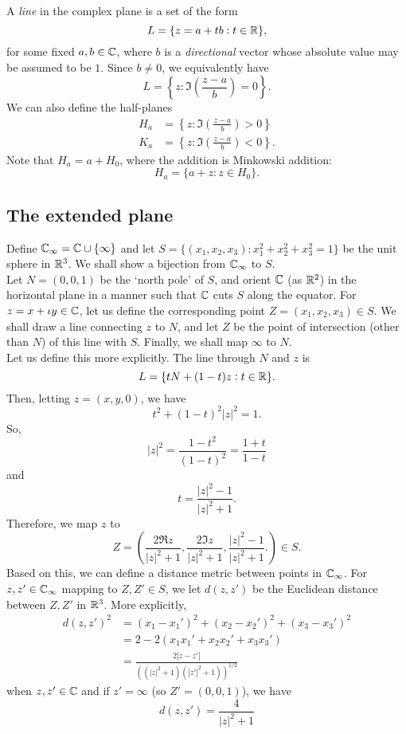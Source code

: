 	A \emph{line} in the complex plane is a set of the form
	\[ L = \{ z = a+tb : t \in \mathbb{R} \}, \]
	for some fixed $a,b\in\mathbb{C}$, where $b$ is a \emph{directional} vector whose absolute value may be assumed to be $1$. Since $b \ne 0$, we equivalently have
	\[ L = \left\{ z : \Im\left( \frac{z-a}{b} \right) = 0 \right\}. \]
	We can also define the half-planes
	\begin{align*}
		H_a &= \left\{ z : \Im\left( \frac{z-a}{b} \right) > 0 \right\} \\
		K_a &= \left\{ z : \Im\left( \frac{z-a}{b} \right) < 0 \right\}.
	\end{align*}
	Note that $H_a = a + H_0$, where the addition is Minkowski addition:
	\[ H_a = \{ a + z : z \in H_0 \}. \]

\subsection{The extended plane}
	
	Define $\mathbb{C}_\infty = \mathbb{C} \cup \{\infty\}$ and let $S = \{(x_1,x_2,x_3) : x_1^2 + x_2^2 + x_3^2 = 1\}$ be the unit sphere in $\mathbb{R}^3$. We shall show a bijection from $\mathbb{C}_\infty$ to $S$.\\
	Let $N = (0,0,1)$ be the `north pole' of $S$, and orient $\mathbb{C}$ (as $\mathbb{R}^2$) in the horizontal plane in a manner such that $\mathbb{C}$ cuts $S$ along the equator. For $z = x + \iota y \in \mathbb{C}$, let us define the corresponding point $Z = (x_1,x_2,x_3) \in S$. We shall draw a line connecting $z$ to $N$, and let $Z$ be the point of intersection (other than $N$) of this line with $S$. Finally, we shall map $\infty$ to $N$.\\
	Let us define this more explicitly. The line through $N$ and $z$ is
	\[ L = \{ tN + (1-t)z : t \in \mathbb{R} \}. \]
	Then, letting $z = (x,y,0)$, we have
	\[ t^2 + (1-t)^2 |z|^2 = 1. \]
	So,
	\[ |z|^2 = \frac{1-t^2}{(1-t)^2} = \frac{1+t}{1-t} \]
	and
	\[ t = \frac{|z|^2-1}{|z|^2+1}. \]
	Therefore, we map $z$ to
	\[ Z = \left( \frac{2 \Re z}{|z|^2+1} , \frac{2 \Im z}{|z|^2+1} , \frac{|z|^2-1}{|z|^2+1}. \right) \in S. \]
	Based on this, we can define a distance metric between points in $\mathbb{C}_\infty$. For $z,z' \in \mathbb{C}_\infty$ mapping to $Z,Z' \in S$, we let $d(z,z')$ be the Euclidean distance between $Z,Z'$ in $\mathbb{R}^3$. More explicitly,
	\begin{align*}
		d(z,z')^2 &= (x_1 - x_1')^2 + (x_2 - x_2')^2 + (x_3 - x_3')^2 \\
			&= 2 - 2(x_1x_1' + x_2x_2' + x_3x_3') \\
			&= \frac{2|z-z'|}{\left((|z|^2+1) (|z'|^2+1)\right)^{1/2}}
	\end{align*}
	when $z,z'\in\mathbb{C}$ and if $z' = \infty$ (so $Z' = (0,0,1)$), we have
	\[ d(z,z') = \frac{4}{|z|^2 + 1} \]


